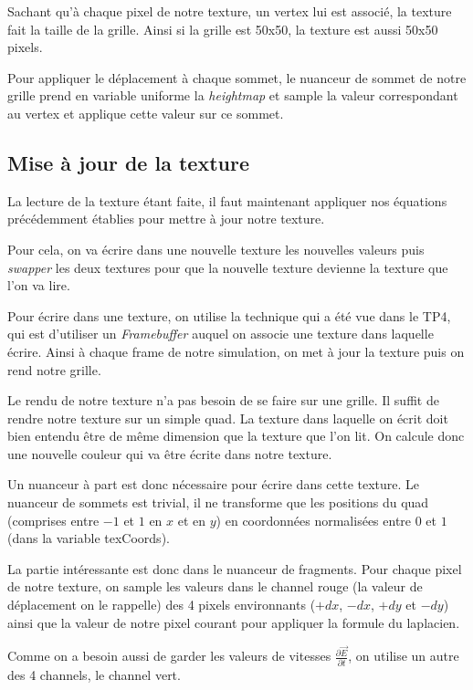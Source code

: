 \documentclass[a4paper,11pt,leqno]{article}
\begin{document}
Sachant qu'à chaque pixel de notre texture, un vertex lui est associé, la texture fait la taille de la grille. Ainsi si la grille est 50x50, la texture est aussi 50x50 pixels.

Pour appliquer le déplacement à chaque sommet, le nuanceur de sommet de notre grille prend en variable uniforme la \emph{heightmap} et sample la valeur correspondant au vertex et applique cette valeur sur ce sommet.

\subsection{Mise à jour de la texture}

La lecture de la texture étant faite, il faut maintenant appliquer nos équations précédemment établies pour mettre à jour notre texture.

Pour cela, on va écrire dans une nouvelle texture les nouvelles valeurs puis \emph{swapper} les deux textures pour que la nouvelle texture devienne la texture que l'on va lire.

Pour écrire dans une texture, on utilise la technique qui a été vue dans le TP4, qui est d'utiliser un \emph{Framebuffer} auquel on associe une texture dans laquelle écrire. Ainsi à chaque frame de notre simulation, on met à jour la texture puis on rend notre grille.

Le rendu de notre texture n'a pas besoin de se faire sur une grille. Il suffit de rendre notre texture sur un simple quad. La texture dans laquelle on écrit doit bien entendu être de même dimension que la texture que l'on lit. On calcule donc une nouvelle couleur qui va être écrite dans notre texture.

Un nuanceur à part est donc nécessaire pour écrire dans cette texture. Le nuanceur de sommets est trivial, il ne transforme que les positions du quad (comprises entre $-1$ et $1$ en $x$ et en $y$) en coordonnées normalisées entre $0$ et $1$ (dans la variable texCoords).

La partie intéressante est donc dans le nuanceur de fragments. Pour chaque pixel de notre texture, on sample les valeurs dans le channel rouge (la valeur de déplacement on le rappelle) des 4 pixels environnants ($+dx$, $-dx$, $+dy$ et $-dy$) ainsi que la valeur de notre pixel courant pour appliquer la formule du laplacien. 

Comme on a besoin aussi de garder les valeurs de vitesses $\frac{\partial \overrightarrow{E}}{\partial t}$, on utilise un autre des 4 channels, le channel vert.
\end{document}
